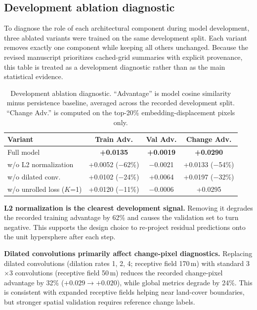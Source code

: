 \documentclass{article}
\begin{document}
\subsection{Development ablation diagnostic}
\label{sec:ablation}

To diagnose the role of each architectural component during model development, three ablated variants were trained on the same development split. Each variant removes exactly one component while keeping all others unchanged. Because the revised manuscript prioritizes cached-grid summaries with explicit provenance, this table is treated as a development diagnostic rather than as the main statistical evidence.

\begin{table}[htbp]
\centering
\caption{Development ablation diagnostic. ``Advantage'' is model cosine similarity minus persistence baseline, averaged across the recorded development split. ``Change Adv.'' is computed on the top-20\% embedding-displacement pixels only.}
\label{tab:ablation}
\begin{tabular}{lccc}
\toprule
Variant & Train Adv. & Val Adv. & Change Adv. \\
\midrule
Full model & \textbf{+0.0135} & \textbf{+0.0019} & \textbf{+0.0290} \\
w/o L2 normalization & +0.0052 ($-$62\%) & $-$0.0021 & +0.0133 ($-$54\%) \\
w/o dilated conv. & +0.0102 ($-$24\%) & +0.0064 & +0.0197 ($-$32\%) \\
w/o unrolled loss ($K$=1) & +0.0120 ($-$11\%) & $-$0.0006 & +0.0295 \\
\bottomrule
\end{tabular}
\end{table}

\textbf{L2 normalization is the clearest development signal.} Removing it degrades the recorded training advantage by 62\% and causes the validation set to turn negative. This supports the design choice to re-project residual predictions onto the unit hypersphere after each step.

\textbf{Dilated convolutions primarily affect change-pixel diagnostics.} Replacing dilated convolutions (dilation rates 1, 2, 4; receptive field 170\,m) with standard 3$\times$3 convolutions (receptive field 50\,m) reduces the recorded change-pixel advantage by 32\% ($+0.029 \to +0.020$), while global metrics degrade by 24\%. This is consistent with expanded receptive fields helping near land-cover boundaries, but stronger spatial validation requires reference change labels.
\end{document}
